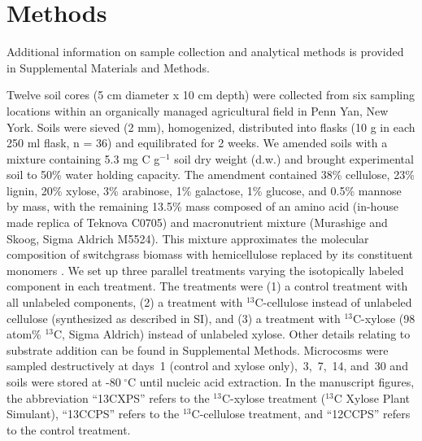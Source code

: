 \section{Methods}
Additional information on sample collection and analytical methods is provided
in Supplemental Materials and Methods. 

Twelve soil cores (5 cm diameter x 10 cm depth) were collected from six 
sampling locations within an organically managed agricultural field in Penn
Yan, New York. Soils were sieved (2 mm), homogenized, distributed into flasks
(10 g in each 250 ml flask, n = 36) and equilibrated for 2 weeks. We amended
soils with a mixture containing 5.3 mg C g$^{-1}$ soil dry weight (d.w.) and
brought experimental soil to 50\% water holding capacity. The amendment
contained 38\% cellulose, 23\% lignin, 20\% xylose, 3\% arabinose, 1\%
galactose, 1\% glucose, and 0.5\% mannose by mass, with the remaining 13.5\%
mass composed of an amino acid (in-house made replica of Teknova C0705) and
macronutrient mixture (Murashige and Skoog, Sigma Aldrich M5524).  This mixture
approximates the molecular composition of switchgrass biomass with
hemicellulose replaced by its constituent monomers
\citep{Schneckenberger_2008}. We set up three parallel treatments varying the
isotopically labeled component in each treatment. The treatments were (1) a
control treatment with all unlabeled components, (2) a treatment with
$^{13}$C-cellulose instead of unlabeled cellulose (synthesized as described in
SI), and (3) a treatment with $^{13}$C-xylose (98 atom\% $^{13}$C, Sigma
Aldrich) instead of unlabeled xylose. Other details relating to substrate
addition can be found in Supplemental Methods. Microcosms were sampled
destructively at days~1 (control and xylose only),~3,~7,~14, and~30 and soils
were stored at -80 $^{\circ}$C until nucleic acid extraction. In the manuscript
figures, the abbreviation “13CXPS” refers to the $^{13}$C-xylose treatment
($^{13}$C Xylose Plant Simulant), “13CCPS” refers to the $^{13}$C-cellulose
treatment, and “12CCPS” refers to the control treatment.

